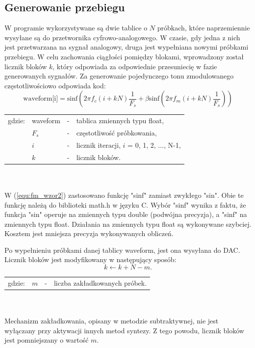 \subsection{Generowanie przebiegu}
W programie wykorzystywane są dwie tablice o $N$ próbkach, które naprzemiennie wysyłane są do przetwornika cyfrowo-analogowego. W czasie, gdy jedna z nich jest przetwarzana na sygnał analogowy, druga jest wypełniana nowymi próbkami przebiegu. W celu zachowania ciągłości pomiędzy blokami, wprowadzony został licznik bloków $k$, który odpowiada za odpowiednie przesuniecię w fazie generowanych sygnałów. Za generowanie pojedynczego tonu zmodulowanego częstotliwościowo odpowiada kod:
\begin{equation} \label{equ:fm_wzor2}
\text{waveform[i]} = \text{sinf}(2\pi f_c(i+kN)\frac{1}{F_s} + \beta \text{sinf}(2 \pi f_m(i+kN)\frac{1}{F_s}))
\end{equation}
\begin{tabular}{ l l l l}
	gdzie: & waveform &  - & tablica zmiennych typu float, \\
	&	$F_s$ & - & częstotliwość próbkowania,\\
	&	$i$ & - &  licznik iteracji, $i$ = 0, 1, 2, ..., N-1,\\
	&	$k$ & - &  licznik bloków.\\
\end{tabular} \\ \\
W (\ref{equ:fm_wzor2}) zastosowano funkcję "sinf" zamiast zwykłego "sin". Obie te funkcję należą do biblioteki math.h w języku C. Wybór "sinf" wynika z faktu, że funkcja "sin" operuje na zmiennych typu double (podwójna precyzja), a "sinf" na zmiennych typu float. Działania na zmiennych typu float są wykonywane szybciej. Kosztem jest mniejsza precyzja wykonywanych obliczeń.

Po wypełnieniu próbkami danej tablicy waveform, jest ona wysyłana do DAC. Licznik bloków jest modyfikowany w następujący sposób:
\begin{equation} \label{equ:fm_wzor3}
k \gets k + N - m.
\end{equation}
\begin{tabular}{ l l l l}
	gdzie: & $m$  &  - & liczba zakładkowanych próbek. \\
\end{tabular} \\ \\
Mechanizm zakładkowania, opisany w metodzie subtraktywnej, nie jest wyłączany przy aktywacji innych metod syntezy. Z tego powodu, licznik bloków jest pomniejszany o wartość $m$.
